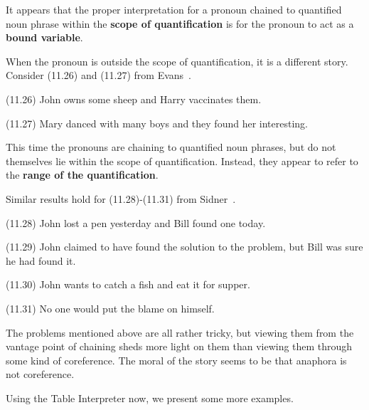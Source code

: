 \documentclass{article}
\begin{document}
It appears that the proper interpretation for a pronoun chained
to quantified noun phrase within the
\textbf{scope of quantification} is for the pronoun to act as a
\textbf{bound variable}.

When the pronoun is outside the scope of quantification, it is a
different story. Consider (11.26) and (11.27) from
Evans~\cite{Evans77}.

\begin{enumerate*}
\item[(11.26)] John owns some sheep and Harry vaccinates them.
\item[(11.27)] Mary danced with many boys and they found her
interesting.
\end{enumerate*}

This time the pronouns are chaining to quantified noun phrases,
but do not themselves lie within the scope of
quantification. Instead, they appear to refer to the
\textbf{range of the quantification}.

Similar results hold for (11.28)-(11.31) from
Sidner~\cite{Sidner79}.

\begin{enumerate*}
\item[(11.28)] John lost a pen yesterday and Bill found one
today.
\item[(11.29)] John claimed to have found the solution to the
problem, but Bill was sure he had found it.
\item[(11.30)] John wants to catch a fish and eat it for
supper.
\item[(11.31)] No one would put the blame on himself.
\end{enumerate*}

The problems mentioned above are all rather tricky, but viewing
them from the vantage point of chaining sheds more light on them
than viewing them through some kind of coreference. The moral of
the story seems to be that anaphora is not coreference.

Using the Table Interpreter now, we present some more examples.

\end{document}
